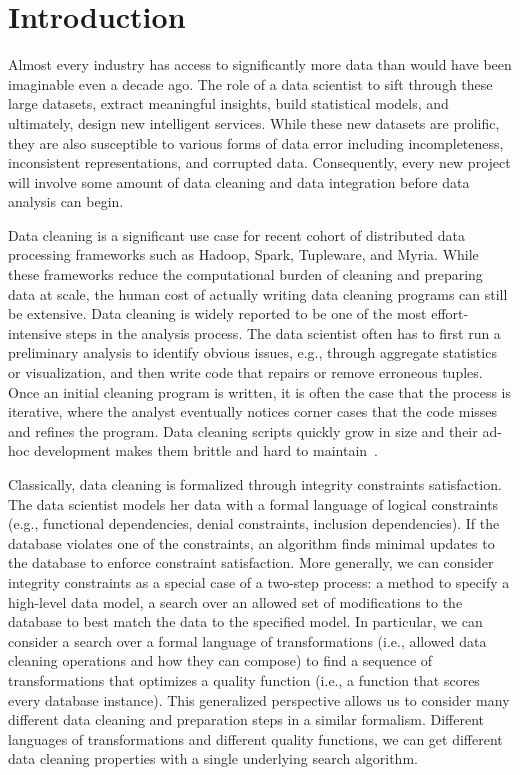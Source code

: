 \section{Introduction}\label{intro}\sloppy
Almost every industry has access to significantly more data than would have been imaginable even a decade ago.
The role of a data scientist to sift through these large datasets, extract meaningful insights, build statistical models, and ultimately, design new  intelligent services. 
While these new datasets are prolific, they are also susceptible to various forms of data error including incompleteness, inconsistent representations, and corrupted data.
Consequently, every new project will involve some amount of data cleaning and data integration before data analysis can begin.

Data cleaning is a significant use case for recent cohort of distributed data processing frameworks such as Hadoop, Spark, Tupleware, and Myria.
While these frameworks reduce the computational burden of cleaning and preparing data at scale, the human cost of actually writing data cleaning programs can still be extensive.
Data cleaning is widely reported to be one of the most effort-intensive steps in the analysis process. 
The data scientist often has to first run a preliminary analysis to identify obvious issues, e.g., through aggregate statistics or visualization, and then write code that repairs or remove erroneous tuples.
Once an initial cleaning program is written, it is often the case that the process is iterative, where the analyst eventually notices corner cases that the code misses and refines the program. 
Data cleaning scripts quickly grow in size and their ad-hoc development makes them brittle and hard to maintain~\cite{krishnan2016hilda}.

Classically, data cleaning is formalized through integrity constraints satisfaction. The data scientist models her data with a formal language of logical constraints (e.g., functional dependencies, denial constraints, inclusion dependencies). If the database violates one of the constraints, an algorithm finds minimal updates to the database to enforce constraint satisfaction.
More generally, we can consider integrity constraints as a special case of a two-step process: a method to specify a high-level data model, a search over an allowed set of modifications to the database to best match the data to the specified model.
In particular, we can consider a search over a formal language of transformations (i.e., allowed data cleaning operations and how they can compose) to find a sequence of transformations that optimizes a quality function (i.e., a function that scores every database instance).
This generalized perspective allows us to consider many different data cleaning and preparation steps in a similar formalism.
Different languages of transformations and different quality functions, we can get different data cleaning properties with a single underlying search algorithm.


